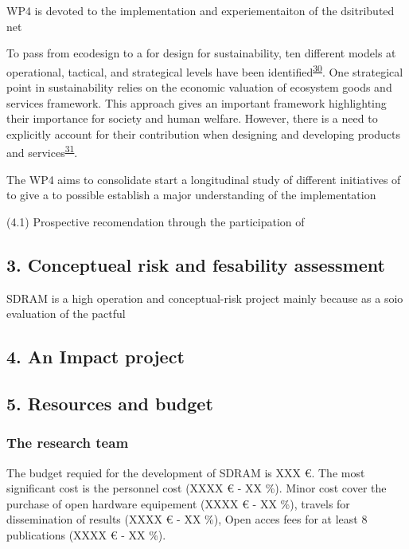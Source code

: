 \documentclass[
  11pt,
  a4paperpaper,
  onecolumn]{article}
\begin{document}
WP4 is devoted to the implementation and experiementaiton of the
dsitributed net

To pass from ecodesign to a for design for sustainability, ten different
models at operational, tactical, and strategical levels have been
identified\textsuperscript{\protect\hyperlink{ref-SousaRocha2019}{30}}.
One strategical point in sustainability relies on the economic valuation
of ecosystem goods and services framework. This approach gives an
important framework highlighting their importance for society and human
welfare. However, there is a need to explicitly account for their
contribution when designing and developing products and
services\textsuperscript{\protect\hyperlink{ref-Diwekar2021}{31}}.

The WP4 aims to consolidate start a longitudinal study of different
initiatives of to give a to possible establish a major understanding of
the implementation

(4.1) Prospective recomendation through the participation of

\hypertarget{conceptueal-risk-and-fesability-assessment}{%
\subsection{3. Conceptueal risk and fesability
assessment}\label{conceptueal-risk-and-fesability-assessment}}

SDRAM is a high operation and conceptual-risk project mainly because as
a soio evaluation of the pactful

\hypertarget{an-impact-project}{%
\subsection{4. An Impact project}\label{an-impact-project}}

\hypertarget{resources-and-budget}{%
\subsection{5. Resources and budget}\label{resources-and-budget}}

\hypertarget{the-research-team}{%
\subsubsection{The research team}\label{the-research-team}}

The budget requied for the development of SDRAM is XXX €. The most
significant cost is the personnel cost (XXXX € - XX \%). Minor cost
cover the purchase of open hardware equipement (XXXX € - XX \%), travels
for dissemination of results (XXXX € - XX \%), Open acces fees for at
least 8 publications (XXXX € - XX \%).
\end{document}
